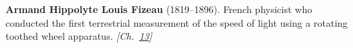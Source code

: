 \textbf{Armand Hippolyte Louis Fizeau} (1819–1896). French physicist who conducted the first terrestrial measurement of the speed of light using a rotating toothed wheel apparatus. \emph{[Ch.~\hyperref[ch:poissonsspot]{13}]}

